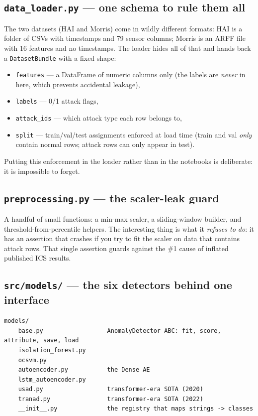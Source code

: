 \documentclass[11pt,a4paper]{article}
\newcommand{\code}[1]{\texttt{#1}}
\begin{document}
\subsection{\texttt{data\_loader.py} --- one schema to rule them all}

The two datasets (HAI and Morris) come in wildly different formats: HAI is a folder of CSVs with timestamps and 79 sensor columns; Morris is an ARFF file with 16 features and no timestamps. The loader hides all of that and hands back a \code{DatasetBundle} with a fixed shape:

\begin{itemize}
  \item \code{features} --- a DataFrame of numeric columns only (the labels are \emph{never} in here, which prevents accidental leakage),
  \item \code{labels} --- 0/1 attack flags,
  \item \code{attack\_ids} --- which attack type each row belongs to,
  \item \code{split} --- train/val/test assignments enforced at load time (train and val \emph{only} contain normal rows; attack rows can only appear in test).
\end{itemize}

Putting this enforcement in the loader rather than in the notebooks is deliberate: it is impossible to forget.

\subsection{\texttt{preprocessing.py} --- the scaler-leak guard}

A handful of small functions: a min-max scaler, a sliding-window builder, and threshold-from-percentile helpers. The interesting thing is what it \emph{refuses to do}: it has an assertion that crashes if you try to fit the scaler on data that contains attack rows. That single assertion guards against the \#1 cause of inflated published ICS results.

\subsection{\texttt{src/models/} --- the six detectors behind one interface}

\begin{Verbatim}
models/
    base.py                  AnomalyDetector ABC: fit, score, attribute, save, load
    isolation_forest.py
    ocsvm.py
    autoencoder.py           the Dense AE
    lstm_autoencoder.py
    usad.py                  transformer-era SOTA (2020)
    tranad.py                transformer-era SOTA (2022)
    __init__.py              the registry that maps strings -> classes
\end{Verbatim}
\end{document}

